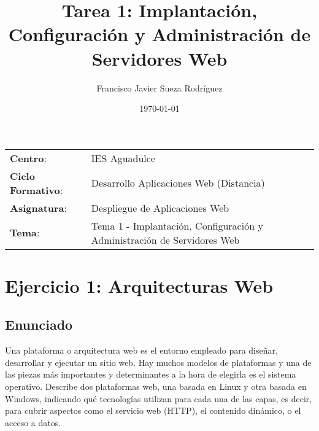 


\title{
\vspace{10ex}
\normalfont \normalsize
\huge \textbf{Tarea 1: Implantación, Configuración y Administración de Servidores Web}
}
\author{Francisco Javier Sueza Rodríguez}
\date{\normalsize\today}




\maketitle

\thispagestyle{empty}

\vspace{68ex}

\begin{center}
    \begin{tabular}{l l}
        \textbf{Centro}: & IES Aguadulce \\
        \textbf{Ciclo Formativo}: & Desarrollo Aplicaciones Web (Distancia)\\
        \textbf{Asignatura}: & Despliegue de Aplicaciones Web\\
        \textbf{Tema}: & Tema 1 -  Implantación, Configuración y Administración de Servidores Web\\
    \end{tabular}
\end{center}

\newpage

\tableofcontents

\newpage
\section{Ejercicio 1: Arquitecturas Web}
\subsection{Enunciado}
Una plataforma o arquitectura web es el entorno empleado para diseñar, desarrollar y ejecutar un sitio web. Hay muchos modelos de plataformas y una de las piezas más importantes y determinantes a la hora de elegirla es el sistema operativo. Describe dos plataformas web, una basada en Linux y otra basada en Windows, indicando qué tecnologías utilizan para cada una de las capas, es decir, para cubrir aspectos como el servicio web (HTTP), el contenido dinámico, o el acceso a datos.

